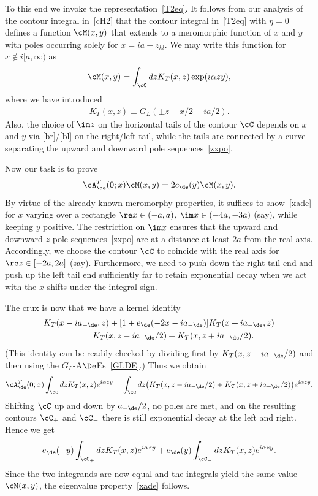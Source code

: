 \documentclass[pdftex]{sigma}
\numberwithin{equation}{section}
\begin{document}
{\sloppy To this end we invoke the representation~\eqref{T2eq}.  It follows from our analysis of the contour integral in~\eqref{cH2} that the contour integral in~\eqref{T2eq} with $\eta=0$ def\/ines a function $\cM(x,y)$ that extends to a meromorphic function of $x$ and $y$ with poles occurring solely for $x=ia+z_{kl}$. We may write this function for $x\notin i[a,\infty)$ as
\begin{gather}
\cM(x,y)=\int_{\cC}dzK_T(x,z)\exp(i\alpha zy),
\end{gather}
where we have introduced
\begin{gather}\label{KT}
K_T(x,z)\equiv G_L(\pm z-x/2-ia/2).
\end{gather}
Also, the choice of $\im z$ on the horizontal tails of the contour $\cC$ depends on $x$ and $y$ via \eqref{br}/\eqref{bl} on the right/left tail, while the tails are connected by a curve separating the upward and downward pole sequences~\eqref{zxpo}.

}

Now our task is to prove
\begin{gather}\label{xade}
\cA^T_{\de}(0;x)\cM(x,y)=2c_{\de}(y)\cM(x,y).
\end{gather}
By virtue of the already known meromorphy properties, it suf\/f\/ices to show~\eqref{xade} for $x$ varying over a rectangle $\re x \in (-a,a)$, $\im x \in (-4a,-3a)$ (say), while keeping $y$ positive. The restriction on $\im x$ ensures that the upward and downward $z$-pole sequences~\eqref{zxpo} are at a distance at least $2a$ from the real axis. Accordingly, we choose the contour $\cC$ to coincide with the real axis for $\re z\in [-2a,2a]$ (say). Furthermore, we need to  push down the right tail end and push up the left tail end suf\/f\/iciently far to retain exponential decay when we act with the $x$-shifts under the integral sign.

The crux is now that we have a kernel identity
\begin{gather}
K_T(x-ia_{-\de},z)+[1+e_{\de}(-2x-ia_{-\de})]K_T(x+ia_{-\de},z)\nonumber\\
\qquad{} =
K_T(x,z-ia_{-\de}/2)+K_T(x,z+ia_{-\de}/2).\label{Kid1}
\end{gather}
(This identity can be readily checked by dividing f\/irst by $K_T(x,z-ia_{-\de}/2)$ and then using the $G_L$-A$\De$Es~\eqref{GLDE}.) Thus we obtain
\begin{gather}
\cA^T_{\de}(0;x)\int_{\cC} dzK_T(x,z)e^{i\alpha zy}
=\int_{\cC} dz\big(K_T(x,z-ia_{-\de}/2)+K_T(x,z+ia_{-\de}/2)\big)e^{i\alpha zy}.
\end{gather}
Shifting $\cC$ up and down by $a_{-\de}/2$, no poles are met, and on the resulting contours $\cC_{+}$ and $\cC_{-}$ there is still exponential decay at the left and right. Hence we get
\begin{gather}
e_{\de}(-y)\int_{\cC_+}dzK_T(x,z)e^{i\alpha zy}+
e_{\de}(y)\int_{\cC_-}dzK_T(x,z)e^{i\alpha zy}.
\end{gather}
Since the two integrands are now equal and the integrals yield the same value $\cM(x,y)$, the eigenvalue property~\eqref{xade} follows.
\end{document}
